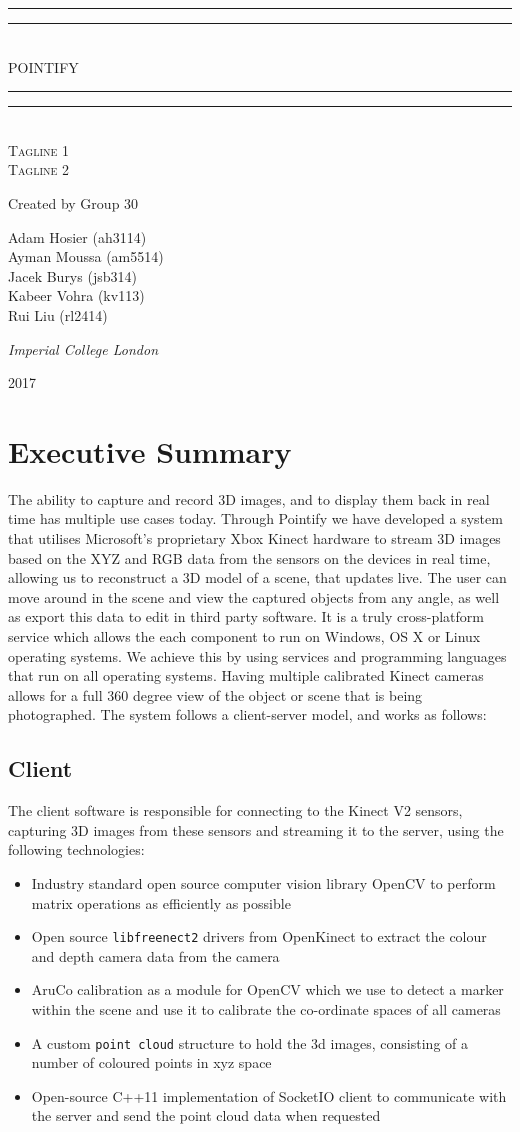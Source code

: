 \documentclass{article}
\newcommand*{\titleGP}{\begingroup %
\centering %
\vspace*{\baselineskip} %

\rule{\textwidth}{1.6pt}\vspace*{-\baselineskip}\vspace*{2pt} %
\rule{\textwidth}{0.4pt}\\[\baselineskip] %

{\LARGE POINTIFY}\\[0.2\baselineskip] %

\rule{\textwidth}{0.4pt}\vspace*{-\baselineskip}\vspace{3.2pt} %
\rule{\textwidth}{1.6pt}\\[\baselineskip] %

\scshape %
Tagline 1 \\ 
Tagline 2\par

\vspace*{2\baselineskip}

Created by Group 30\\[\baselineskip]
{\Large Adam Hosier (ah3114)\\ Ayman Moussa (am5514) \\Jacek Burys (jsb314) \\Kabeer Vohra (kv113) \\ Rui Liu (rl2414) \\  \par} %

\vspace*{1\baselineskip}
{\itshape Imperial College London\par} %

\vfill 

{\scshape 2017} \\[0.3\baselineskip] %

\endgroup}
\begin{document}
 

\titleGP
\thispagestyle{empty}

\newpage
\setcounter{page}{1}
\tableofcontents

\newpage
\section{Executive Summary}
The ability to capture and record 3D images, and to display them back in real time has multiple use cases today. Through Pointify we have developed a system that utilises Microsoft's proprietary Xbox Kinect hardware to stream 3D images based on the XYZ and RGB data from the sensors on the devices in real time, allowing us to reconstruct a 3D model of a scene, that updates live. The user can move around in the scene and view the captured objects from any angle, as well as export this data to edit in third party software. It is a truly cross-platform service which allows the each component to run on Windows, OS X or Linux operating systems. We achieve this by using services and programming languages that run on all operating systems. Having multiple calibrated Kinect cameras allows for a full 360 degree view of the object or scene that is being photographed. The system follows a client-server model, and works as follows:
\subsection{Client}
The client software is responsible for connecting to the Kinect V2 sensors, capturing 3D images from these sensors and streaming it to the server, using the following technologies:
\begin{itemize}
\item Industry standard open source computer vision library OpenCV to perform matrix operations as efficiently as possible
\item Open source \texttt{libfreenect2} drivers from OpenKinect to extract the colour and depth camera data from the camera
\item AruCo calibration as a module for OpenCV which we use to detect a marker within the scene and use it to calibrate the co-ordinate spaces of all cameras
\item A custom \texttt{point cloud} structure to hold the 3d images, consisting of a number of coloured points in xyz space
\item Open-source C++11 implementation of SocketIO client to communicate with the server and send the point cloud data when requested
\end{itemize}
\end{document}
